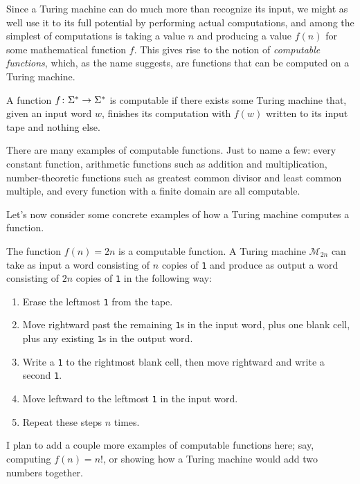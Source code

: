 Since a Turing machine can do much more than recognize its input, we might as well use it to its full potential by performing actual computations, and among the simplest of computations is taking a value $n$ and producing a value $f(n)$ for some mathematical function $f$. This gives rise to the notion of \emph{computable functions}, which, as the name suggests, are functions that can be computed on a Turing machine.

\begin{definition}
A function $f \colon \Sigma^{*} \to \Sigma^{*}$ is computable if there exists some Turing machine that, given an input word $w$, finishes its computation with $f(w)$ written to its input tape and nothing else.
\end{definition}

There are many examples of computable functions. Just to name a few: every constant function, arithmetic functions such as addition and multiplication, number-theoretic functions such as greatest common divisor and least common multiple, and every function with a finite domain are all computable.

Let's now consider some concrete examples of how a Turing machine computes a function.

\begin{example}
The function $f(n) = 2n$ is a computable function. A Turing machine $\mathcal{M}_{2n}$ can take as input a word consisting of $n$ copies of \texttt{1} and produce as output a word consisting of $2n$ copies of \texttt{1} in the following way:
\begin{enumerate}
\item Erase the leftmost \texttt{1} from the tape.
\item Move rightward past the remaining \texttt{1}s in the input word, plus one blank cell, plus any existing \texttt{1}s in the output word.
\item Write a \texttt{1} to the rightmost blank cell, then move rightward and write a second \texttt{1}.
\item Move leftward to the leftmost \texttt{1} in the input word.
\item Repeat these steps $n$ times.
\end{enumerate}
\end{example}

\begin{construction}
I plan to add a couple more examples of computable functions here; say, computing $f(n) = n!$, or showing how a Turing machine would add two numbers together.
\end{construction}

